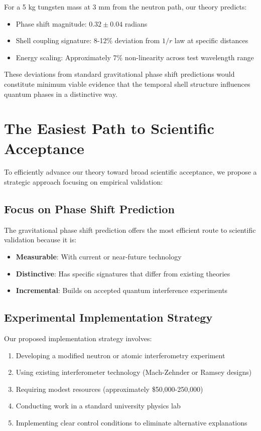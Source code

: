 \documentclass[12pt,a4paper]{article}
\begin{document}
For a 5 kg tungsten mass at 3 mm from the neutron path, our theory predicts:
\begin{itemize}
    \item Phase shift magnitude: $0.32 \pm 0.04$ radians
    \item Shell coupling signature: 8-12\% deviation from $1/r$ law at specific distances
    \item Energy scaling: Approximately 7\% non-linearity across test wavelength range
\end{itemize}

These deviations from standard gravitational phase shift predictions would constitute minimum viable evidence that the temporal shell structure influences quantum phases in a distinctive way.

\section{The Easiest Path to Scientific Acceptance}

To efficiently advance our theory toward broad scientific acceptance, we propose a strategic approach focusing on empirical validation:

\subsection{Focus on Phase Shift Prediction}

The gravitational phase shift prediction offers the most efficient route to scientific validation because it is:
\begin{itemize}
    \item \textbf{Measurable}: With current or near-future technology
    \item \textbf{Distinctive}: Has specific signatures that differ from existing theories
    \item \textbf{Incremental}: Builds on accepted quantum interference experiments
\end{itemize}

\subsection{Experimental Implementation Strategy}

Our proposed implementation strategy involves:
\begin{enumerate}
    \item Developing a modified neutron or atomic interferometry experiment
    \item Using existing interferometer technology (Mach-Zehnder or Ramsey designs)
    \item Requiring modest resources (approximately \$50,000-250,000)
    \item Conducting work in a standard university physics lab
    \item Implementing clear control conditions to eliminate alternative explanations
\end{enumerate}
\end{document}
